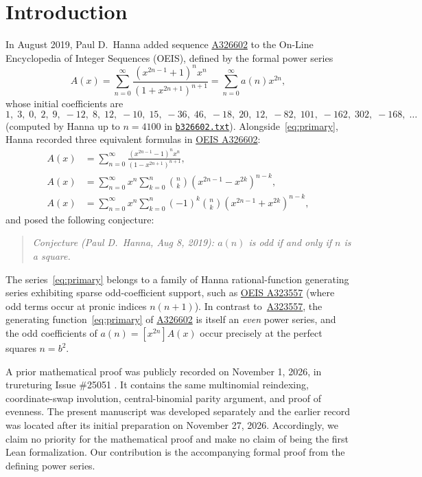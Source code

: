 \documentclass[11pt,a4paper]{article}
\theoremstyle{definition}
\theoremstyle{remark}
\newcommand{\coeff}[1]{[x^{#1}]}
\begin{document}
\section{Introduction}

In August 2019, Paul D.~Hanna added sequence \href{https://oeis.org/A326602}{A326602} to the On-Line Encyclopedia of Integer Sequences (OEIS), defined by the formal power series
\begin{equation}\label{eq:primary}
A(x) = \sum_{n=0}^{\infty} \frac{(x^{2n-1}+1)^n x^n}{(1+x^{2n+1})^{n+1}}
     = \sum_{n=0}^{\infty} a(n) x^{2n},
\end{equation}
whose initial coefficients are
\[
1,\; 3,\; 0,\; 2,\; 9,\; -12,\; 8,\; 12,\; -10,\; 15,\; -36,\; 46,\; -18,\; 20,\; 12,\; -82,\; 101,\; -162,\; 302,\; -168,\; \dots
\]
(computed by Hanna up to $n = 4100$ in \href{https://oeis.org/A326602/b326602.txt}{\texttt{b326602.txt}}). Alongside~\eqref{eq:primary}, Hanna recorded three equivalent formulas in \href{https://oeis.org/A326602}{OEIS A326602}:
\begin{align}
A(x) &= \sum_{n=0}^{\infty} \frac{(x^{2n-1}-1)^n x^n}{(1-x^{2n+1})^{n+1}}, \label{eq:hanna2}\\
A(x) &= \sum_{n=0}^{\infty} x^n \sum_{k=0}^{n} \binom{n}{k} (x^{2n-1} - x^{2k})^{n-k}, \label{eq:hanna3}\\
A(x) &= \sum_{n=0}^{\infty} x^n \sum_{k=0}^{n} (-1)^k \binom{n}{k} (x^{2n-1} + x^{2k})^{n-k}, \label{eq:hanna4}
\end{align}
and posed the following conjecture:
\begin{quote}
\emph{Conjecture (Paul D.~Hanna, Aug 8, 2019): $a(n)$ is odd if and only if $n$ is a square.}
\end{quote}

The series~\eqref{eq:primary} belongs to a family of Hanna rational-function generating series exhibiting sparse odd-coefficient support, such as \href{https://oeis.org/A323557}{OEIS A323557} (where odd terms occur at pronic indices $n(n+1)$). In contrast to~\href{https://oeis.org/A323557}{A323557}, the generating function~\eqref{eq:primary} of \href{https://oeis.org/A326602}{A326602} is itself an \emph{even} power series, and the odd coefficients of $a(n) = \coeff{2n} A(x)$ occur precisely at the perfect squares $n = b^2$.

A prior mathematical proof was publicly recorded on November 1, 2026, in trureturing Issue \#25051 \cite{Trureturing2026}. It contains the same multinomial reindexing, coordinate-swap involution, central-binomial parity argument, and proof of evenness. The present manuscript was developed separately and the earlier record was located after its initial preparation on November 27, 2026. Accordingly, we claim no priority for the mathematical proof and make no claim of being the first Lean formalization. Our contribution is the accompanying formal proof from the defining power series.
\end{document}
